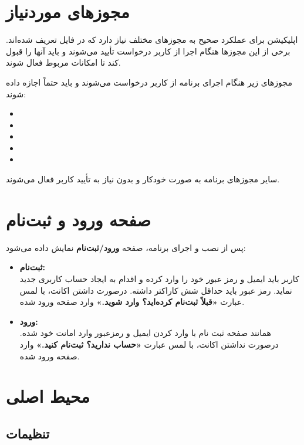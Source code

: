 \documentclass{report}
\begin{document}
\section{مجوزهای موردنیاز}

اپلیکیشن برای عملکرد صحیح به مجوزهای مختلف نیاز دارد که در فایل  تعریف شده‌اند. برخی از این مجوزها هنگام اجرا از کاربر درخواست تأیید می‌شوند و باید آنها را قبول کند تا امکانات مربوط فعال شوند.

مجوزهای زیر هنگام اجرای برنامه از کاربر درخواست می‌شوند و باید حتماً اجازه داده شوند:

\begin{itemize}
	\item {}
	\item {}
	\item {}
	\item {}
	\item {}
\end{itemize}

سایر مجوزهای برنامه به صورت خودکار و بدون نیاز به تأیید کاربر فعال می‌شوند.

\section{صفحه ورود و ثبت‌نام}

پس از نصب و اجرای برنامه، صفحه \textbf{ورود/ثبت‌نام} نمایش داده می‌شود:

\begin{itemize}
	\item \textbf{ثبت‌نام:}\\
	کاربر باید ایمیل و رمز عبور خود را وارد کرده و اقدام به ایجاد حساب کاربری جدید نماید. رمز عبور باید حداقل شش کاراکتر داشته. درصورت داشتن اکانت، با لمس عبارت \textbf{«قبلاً ثبت‌نام کرده‌اید؟ وارد شوید.»} وارد صفحه ورود  شده.
	
	\item \textbf{ورود:}\\
	همانند صفحه ثبت نام با وارد کردن ایمیل و رمزعبور وارد امانت خود شده. درصورت نداشتن اکانت، با لمس عبارت \textbf{«حساب ندارید؟ ثبت‌نام کنید.»} وارد صفحه ورود  شده.
\end{itemize}

\section{محیط اصلی}

\subsection{تنظیمات}
\end{document}
